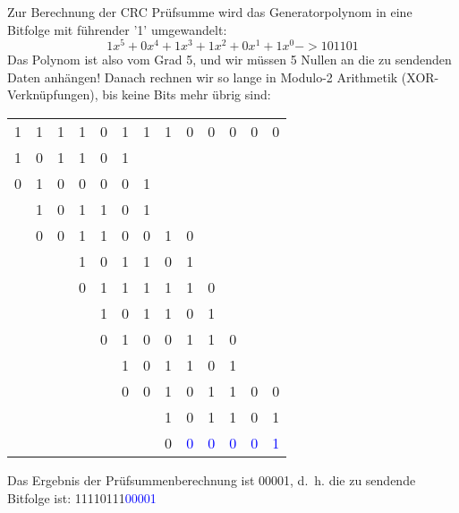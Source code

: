 
Zur Berechnung der CRC Prüfsumme wird das Generatorpolynom in eine Bitfolge mit führender '1' umgewandelt:
\[1x^5 + 0x^4 + 1x^3 + 1x^2 + 0x^1 + 1x^0 ->  101101\]
Das Polynom ist also vom Grad 5, und wir müssen 5 Nullen an die zu sendenden Daten anhängen!
Danach rechnen wir so lange in Modulo-2 Arithmetik (XOR-Verknüpfungen), bis keine Bits mehr übrig sind:

\begin{center}
    \begin{tabular}{c c c c c c c c c c c c c}
        1 & 1 & 1 & 1 & 0 & 1 & 1 & 1 & 0 & 0 & 0 & 0 & 0 \tabularnewline
        1 & 0 & 1 & 1 & 0 & 1 & & & & & & & \tabularnewline
        \hline
        0 & 1 & 0 & 0 & 0 & 0 & 1 & & & & & & \tabularnewline
        & 1 & 0 & 1 & 1 & 0 & 1 & & & & & & \tabularnewline
        \hline
        & 0 & 0 & 1 & 1 & 0 & 0 & 1 & 0 & & & & \tabularnewline
        & & & 1 & 0 & 1 & 1 & 0 & 1 & & & & \tabularnewline
        \hline
        & & & 0 & 1 & 1 & 1 & 1 & 1 & 0 & & & \tabularnewline
        & & & & 1 & 0 & 1 & 1 & 0 & 1 & & & \tabularnewline
        \hline
        & & & & 0 & 1 & 0 & 0 & 1 & 1 & 0 & & \tabularnewline
        & & & & & 1 & 0 & 1 & 1 & 0 & 1 & & \tabularnewline
        \hline
        & & & & & 0 & 0 & 1 & 0 & 1 & 1 & 0 & 0 \tabularnewline
        & & & & & & & 1 & 0 & 1 & 1 & 0 & 1 \tabularnewline
        \hline
        & & & & & & & 0 & \textcolor{blue}{0} & \textcolor{blue}{0} & \textcolor{blue}{0} & \textcolor{blue}{0} & \textcolor{blue}{1} \tabularnewline
    \end{tabular}
\end{center}

Das Ergebnis der Prüfsummenberechnung ist 00001, d.\ h. die zu sendende Bitfolge ist: 11110111\textcolor{blue}{00001}